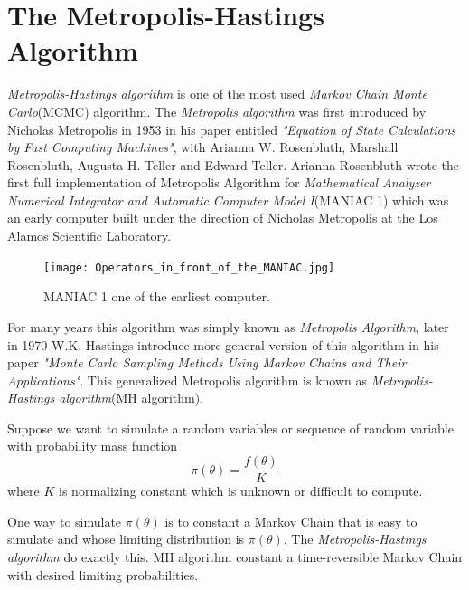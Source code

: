 \section{The Metropolis-Hastings Algorithm}

\textit{Metropolis-Hastings algorithm} is one of the most used \textit{Markov Chain Monte Carlo}(MCMC) algorithm.
The \textit{Metropolis algorithm} was first introduced by Nicholas Metropolis in 1953 in his paper entitled \textit{"Equation of State Calculations by Fast Computing Machines"}, with Arianna W. Rosenbluth, Marshall Rosenbluth, Augusta H. Teller and Edward Teller.
Arianna Rosenbluth wrote the first full implementation of Metropolis Algorithm for  \textit{Mathematical Analyzer Numerical Integrator and Automatic Computer Model I}(MANIAC 1) which was an early computer built under the direction of Nicholas Metropolis at the Los Alamos Scientific Laboratory.

\begin{figure}[H]
	\centering
	\texttt{[image: Operators\_in\_front\_of\_the\_MANIAC.jpg]}
	\caption{MANIAC 1 one of the earliest computer.}
	\label{MANIAC}
\end{figure}

For many years this algorithm was simply known as \textit{Metropolis Algorithm}, later in 1970 W.K. Hastings introduce more general version of this algorithm in his paper \textit{"Monte Carlo Sampling Methods Using Markov Chains and Their Applications"}. This generalized Metropolis algorithm is known as \textit{Metropolis-Hastings algorithm}(MH algorithm).

Suppose we want to simulate a random variables or sequence of random variable with probability mass function
\begin{equation}
	\pi(\theta) = \frac{f(\theta)}{K}
\end{equation}
where $ K $ is normalizing constant which is unknown or difficult to compute.

One way to simulate $ \pi(\theta) $ is to constant a Markov Chain that is easy to simulate and whose limiting distribution is $ \pi(\theta) $.
The \textit{Metropolis-Hastings algorithm} do exactly this. MH algorithm constant a time-reversible Markov Chain with desired limiting probabilities.


